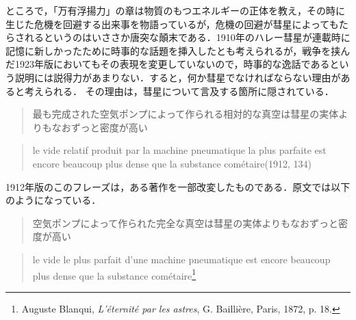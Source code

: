 ところで，「万有浮揚力」の章は物質のもつエネルギーの正体を教え，その時に生じた危機を回避する出来事を物語っているが，危機の回避が彗星によってもたらされるというのはいささか唐突な顛末である．1910年のハレー彗星が連載時に記憶に新しかったために時事的な話題を挿入したとも考えられるが，戦争を挟んだ1923年版においてもその表現を変更していないので，時事的な逸話であるという説明には説得力があまりない．すると，何か彗星でなければならない理由があると考えられる． その理由は，彗星について言及する箇所に隠されている．

\begin{quote}
最も完成された空気ポンプによって作られる相対的な真空は彗星の実体よりもなおずっと密度が高い
\end{quote}
\begin{quote}
le vide relatif produit par la machine pneumatique la plus parfaite est encore beaucoup plus dense que la substance cométaire(1912, 134)
\end{quote}

1912年版のこのフレーズは，ある著作を一部改変したものである．原文では以下のようになっている．

\begin{quote}
空気ポンプによって作られた完全な真空は彗星の実体よりもなおずっと密度が高い
\end{quote}
\begin{quote}
  le vide le plus parfait d'une machine pneumatique est encore beaucoup plus dense que la substance cométaire\footnote{Auguste Blanqui, \emph{L'éternité par les astres}, G. Baillière, Paris, 1872, p. 18.}
\end{quote}

